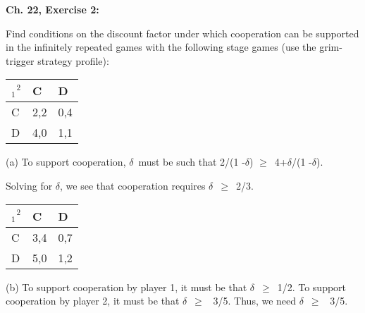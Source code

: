 \documentclass[handout]{beamer}
\begin{document}
\begin{frame}%

\textbf{Ch. 22, Exercise 2:}

{\footnotesize Find conditions on the discount factor under which
cooperation can be supported in the infinitely repeated games with the
following stage games (use the grim-trigger strategy profile):}

{\footnotesize \bigskip }

\begin{tabular}{|l|l|l|}
\hline
$_{1}^{\text{ \ \ \ \ \ \ }2}$ & {\footnotesize C} & {\footnotesize D} \\ 
\hline
{\footnotesize C} & {\footnotesize 2,2} & {\footnotesize 0,4} \\ \hline
{\footnotesize D} & {\footnotesize 4,0} & {\footnotesize 1,1} \\ \hline
\end{tabular}

\pause%
{\footnotesize (a) To support cooperation, }$\delta ${\footnotesize \ must
be such that 2/(1 -}$\delta ${\footnotesize ) }$\geq ${\footnotesize \ 4+}$%
\delta ${\footnotesize /(1 -}$\delta ${\footnotesize ).}

{\footnotesize Solving for }$\delta ${\footnotesize , we see that
cooperation requires }$\delta ${\footnotesize \ }$\geq ${\footnotesize \ 2/3.%
}

{\footnotesize \bigskip }

\pause%

\begin{tabular}{|l|l|l|}
\hline
$_{1}^{\text{ \ \ \ \ \ \ }2}$ & {\footnotesize C} & {\footnotesize D} \\ 
\hline
{\footnotesize C} & {\footnotesize 3,4} & {\footnotesize 0,7} \\ \hline
{\footnotesize D} & {\footnotesize 5,0} & {\footnotesize 1,2} \\ \hline
\end{tabular}

{\footnotesize (b) To support cooperation by player 1, it must be that }$%
\delta ${\footnotesize \ }$\geq ${\footnotesize \ 1/2. To support
cooperation by player 2, it must be that }$\delta ${\footnotesize \ }$\geq $%
{\footnotesize \ 3/5. Thus, we need }$\delta ${\footnotesize \ }$\geq $%
{\footnotesize \ 3/5.}

{\footnotesize \bigskip }

\end{frame}%
\end{document}
